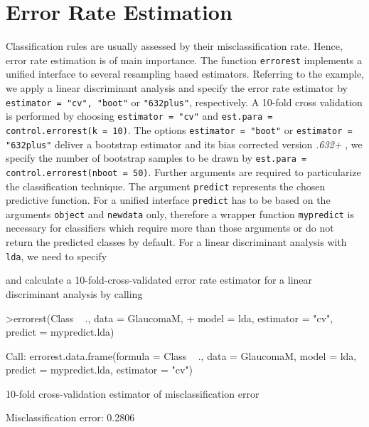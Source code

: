 \documentclass[11pt]{article}
\begin{document}
\section{Error Rate Estimation}
Classification rules are usually assessed by their misclassification rate. 
Hence, error rate estimation is of main importance. 
The function \texttt{errorest} implements a unified interface to several
resampling based estimators. Referring to the example, we apply a linear
discriminant analysis and specify the error rate estimator 
by \texttt{estimator = "cv", "boot"} or \texttt{"632plus"}, 
respectively. A 10-fold cross validation is performed by 
choosing \texttt{estimator = "cv"} and 
\texttt{est.para = control.errorest(k = 10)}. The options \texttt{estimator = "boot"} or 
\texttt{estimator = "632plus"} deliver a bootstrap estimator 
and its  bias corrected version {\sl .632+} \citep[see][]{efron:1997}, 
we specify the number of bootstrap samples to be drawn by 
\texttt{est.para = control.errorest(nboot = 50)}. 
Further arguments are required to particularize the 
classification technique. The argument \texttt{predict} represents 
the chosen predictive function. For a unified interface 
\texttt{predict} has to be based on the arguments \texttt{object} 
and \texttt{newdata} only, therefore a wrapper function \texttt{mypredict} is necessary for classifiers 
which require more than those arguments or do not return the predicted
classes by default. For a linear discriminant analysis with \texttt{lda}, we
need to specify  
\begin{Schunk}
\end{Schunk}
and calculate a 10-fold-cross-validated error rate estimator 
for a linear discriminant analysis by calling 
\begin{Schunk}
\begin{Sinput}
>errorest(Class ~ ., data = GlaucomaM, 
+     model = lda, estimator = "cv", predict = mypredict.lda)
\end{Sinput}
\begin{Soutput}
Call:
errorest.data.frame(formula = Class ~ ., data = GlaucomaM, model = lda, 
    predict = mypredict.lda, estimator = "cv")

	 10-fold cross-validation estimator of misclassification error 

Misclassification error:  0.2806 
\end{Soutput}
\end{Schunk}
\end{document}
